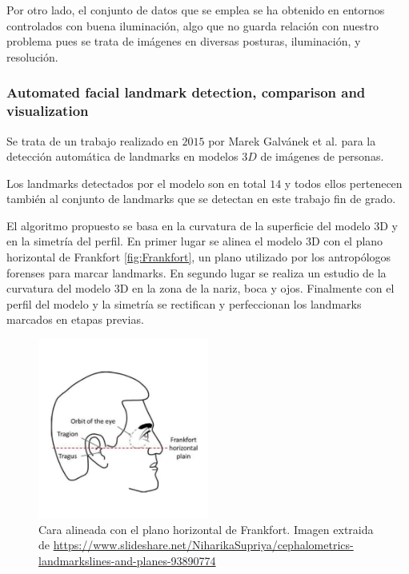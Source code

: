                 \medskip

                \noindent Por otro lado, el conjunto de datos que se emplea se ha obtenido en entornos controlados con buena iluminación, algo que no guarda relación con nuestro problema pues se trata de imágenes en diversas posturas, iluminación, y resolución.

            \subsubsection{Automated facial landmark detection, comparison and visualization}
                \noindent Se trata de un trabajo realizado en $2015$ por Marek Galvánek et al. \cite{galvanek2015automated} para la detección automática de landmarks en modelos $3D$ de imágenes de personas. 

                \medskip

                \noindent Los landmarks detectados por el modelo son en total $14$ y todos ellos pertenecen también al conjunto de landmarks que se detectan en este trabajo fin de grado.

                \medskip

                \noindent El algoritmo propuesto se basa en la curvatura de la superficie del modelo $3$D y en la simetría del perfil. En primer lugar se alinea el modelo $3$D con el plano horizontal de Frankfort \autoref{fig:Frankfort}, un plano utilizado por los antropólogos forenses para marcar landmarks. En segundo lugar se realiza un estudio de la curvatura del modelo $3$D en la zona de la nariz, boca y ojos. Finalmente con el perfil del modelo y la simetría se rectifican y perfeccionan los landmarks marcados en etapas previas.

                \begin{figure}[!h]
                    \centering
                    \includegraphics[width=0.5\textwidth]{img/frankfort.png}
                    \caption{Cara alineada con el plano horizontal de Frankfort. Imagen extraida de \url{https://www.slideshare.net/NiharikaSupriya/cephalometrics-landmarkslines-and-planes-93890774
                    }}
                    \label{fig:Frankfort}
                \end{figure}

